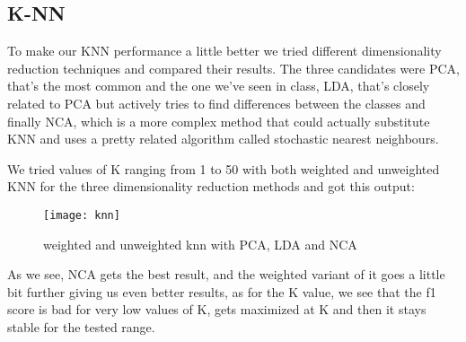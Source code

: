 
\subsection{K-NN}%
\label{sub:knn}
To make our KNN performance a little better we tried different dimensionality reduction techniques and compared their results.
The three candidates were PCA, that's the most common and the one we've seen in class, LDA, that's closely related to PCA but actively tries to find differences between the classes and finally NCA, which is a more complex method that could actually substitute KNN and uses a pretty related algorithm called stochastic nearest neighbours.

We tried values of K ranging from 1 to 50 with both weighted and unweighted KNN for the three dimensionality reduction methods and got this output:
\begin{figure}[H]
    \centering
    \texttt{[image: knn]}
    \caption{weighted and unweighted knn with PCA, LDA and NCA}%
    \label{fig:knn_pca_lda_nca}
\end{figure}


As we see, NCA gets the best result, and the weighted variant of it goes a little bit further giving us even better results, as for the K value, we see that the f1 score is bad for very low values of K, gets maximized at K and then it stays stable for the tested range.

